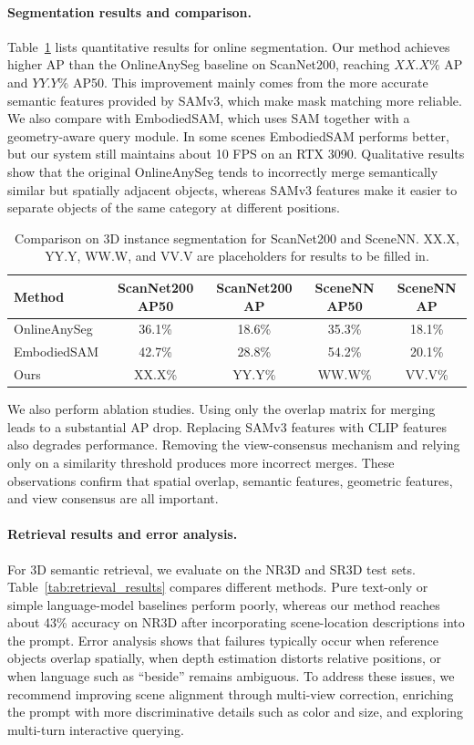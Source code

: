 \documentclass[12pt,a4paper]{article}
\begin{document}
\paragraph{Segmentation results and comparison.}
Table~\ref{tab:seg_results} lists quantitative results for online segmentation. Our method achieves higher AP than the OnlineAnySeg baseline on ScanNet200, reaching $XX.X\%$ AP and $YY.Y\%$ AP50. This improvement mainly comes from the more accurate semantic features provided by SAMv3, which make mask matching more reliable. We also compare with EmbodiedSAM, which uses SAM together with a geometry-aware query module. In some scenes EmbodiedSAM performs better, but our system still maintains about 10 FPS on an RTX 3090. Qualitative results show that the original OnlineAnySeg tends to incorrectly merge semantically similar but spatially adjacent objects, whereas SAMv3 features make it easier to separate objects of the same category at different positions.

\begin{table}[H]
\centering
\small
\begin{tabular}{lcccc}
\toprule
Method & ScanNet200 AP50 & ScanNet200 AP & SceneNN AP50 & SceneNN AP \\
\midrule
OnlineAnySeg & 36.1\% & 18.6\% & 35.3\% & 18.1\% \\
EmbodiedSAM & 42.7\% & 28.8\% & 54.2\% & 20.1\% \\
Ours & XX.X\% & YY.Y\% & WW.W\% & VV.V\% \\
\bottomrule
\end{tabular}
\caption{Comparison on 3D instance segmentation for ScanNet200 and SceneNN. XX.X, YY.Y, WW.W, and VV.V are placeholders for results to be filled in.}
\label{tab:seg_results}
\end{table}

We also perform ablation studies. Using only the overlap matrix for merging leads to a substantial AP drop. Replacing SAMv3 features with CLIP features also degrades performance. Removing the view-consensus mechanism and relying only on a similarity threshold produces more incorrect merges. These observations confirm that spatial overlap, semantic features, geometric features, and view consensus are all important.

\paragraph{Retrieval results and error analysis.}
For 3D semantic retrieval, we evaluate on the NR3D and SR3D test sets. Table~\ref{tab:retrieval_results} compares different methods. Pure text-only or simple language-model baselines perform poorly, whereas our method reaches about 43\% accuracy on NR3D after incorporating scene-location descriptions into the prompt. Error analysis shows that failures typically occur when reference objects overlap spatially, when depth estimation distorts relative positions, or when language such as ``beside'' remains ambiguous. To address these issues, we recommend improving scene alignment through multi-view correction, enriching the prompt with more discriminative details such as color and size, and exploring multi-turn interactive querying.
\end{document}
